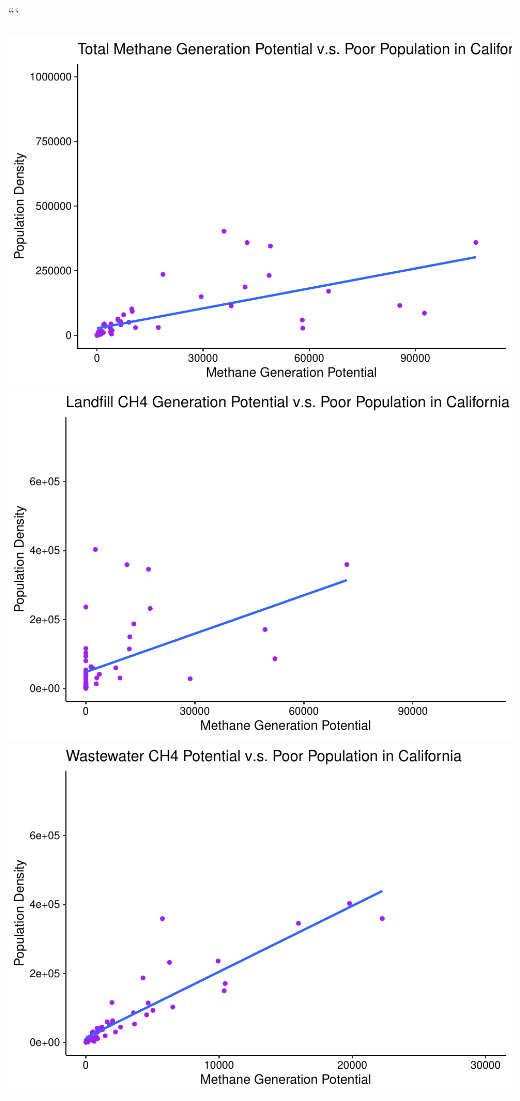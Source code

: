 \documentclass[
  12pt,
]{article}
\begin{document}
```

\includegraphics{FDR_Final_files/figure-latex/unnamed-chunk-8-1.pdf}
\includegraphics{FDR_Final_files/figure-latex/unnamed-chunk-8-2.pdf}
\includegraphics{FDR_Final_files/figure-latex/unnamed-chunk-8-3.pdf}
\end{document}

